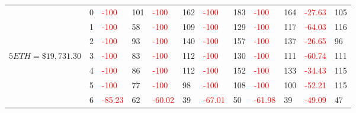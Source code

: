 \begin{table}[htb!]
\begin{adjustwidth}{-0.9in}{-0.9in}
\begin{tabular}{|p{5em}|p{2em}|p{3em}|p{3em}|p{3em}|p{3em}|p{3em}|p{3em}|p{3em}|p{3em}|p{3em}|p{3em}|}
            & 0 & \textcolor{red}{-100} & 101 & \textcolor{red}{-100} & 162 & \textcolor{red}{-100} & 183 & \textcolor{red}{-100} & 164 & \textcolor{red}{-27.63} & 105\\\cline{3-12}
            & 1 & \textcolor{red}{-100} & 58 & \textcolor{red}{-100} & 109 & \textcolor{red}{-100} & 129 & \textcolor{red}{-100} & 117 & \textcolor{red}{-64.03} & 116\\\cline{3-12}
            & 2 & \textcolor{red}{-100} & 93 & \textcolor{red}{-100} & 140 & \textcolor{red}{-100} & 157 & \textcolor{red}{-100} & 137 & \textcolor{red}{-26.65} & 96\\\cline{3-12}
            $5 ETH = \$19,731.30$ & 3 & \textcolor{red}{-100} & 83 & \textcolor{red}{-100} & 112 & \textcolor{red}{-100} & 130 & \textcolor{red}{-100} & 111 & \textcolor{red}{-60.74} & 111\\[-3ex]\cline{3-12}
            & 4 & \textcolor{red}{-100} & 86 & \textcolor{red}{-100} & 112 & \textcolor{red}{-100} & 152 & \textcolor{red}{-100} & 133 & \textcolor{red}{-34.43} & 115\\\cline{3-12}
            & 5 & \textcolor{red}{-100} & 77 & \textcolor{red}{-100} & 98 & \textcolor{red}{-100} & 108 & \textcolor{red}{-100} & 100 & \textcolor{red}{-52.21} & 115\\\cline{3-12}
            & 6 & \textcolor{red}{-85.23} & 62 & \textcolor{red}{-60.02} & 39 & \textcolor{red}{-67.01} & 50 & \textcolor{red}{-61.98} & 39 & \textcolor{red}{-49.09} & 47\\\hline\hline


\end{tabular}
\end{adjustwidth}
\end{table}
